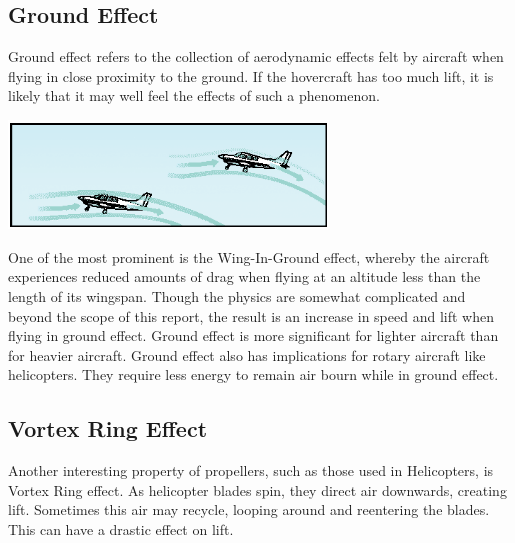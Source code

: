 \subsection{Ground Effect}
Ground effect refers to the collection of aerodynamic effects felt by aircraft when flying in close proximity to the ground. If the hovercraft has too much lift, it is likely that it may well feel the effects of such a phenomenon.


  \begin{center}
    \includegraphics[width=85mm]{imageSources/groundEffect.png}
  \end{center}
  \label{groundEffect}

One of the most prominent is the Wing-In-Ground effect, whereby the aircraft experiences reduced amounts of drag when flying at an altitude less than the length of its wingspan. Though the physics are somewhat complicated and beyond the scope of this report, the result is an increase in speed and lift when flying in ground effect. Ground effect is more significant for lighter aircraft than for heavier aircraft. Ground effect also has implications for rotary aircraft like helicopters. They require less energy to remain air bourn while in ground effect.

\subsection{Vortex Ring Effect}
Another interesting property of propellers, such as those used in Helicopters, is Vortex Ring effect. As helicopter blades spin, they direct air downwards, creating lift. Sometimes this air may recycle, looping around and reentering the blades. This can have a drastic effect on lift.

